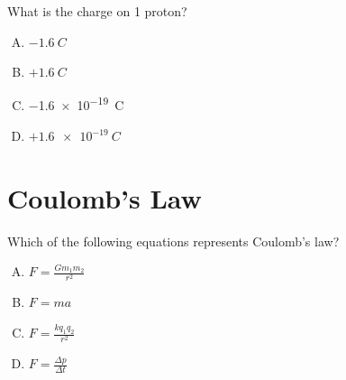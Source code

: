 \documentclass[14pt,t,dvipsnames]{beamer}
\begin{document}
\begin{frame}
What is the charge on 1 proton?
\begin{center}
\begin{minipage}{6cm}
\centering
\begin{enumerate}[A.]
    \item $-\SI{1.6}{C}$
    \item $+\SI{1.6}{C}$
    \item \alert<2->{\SI{-1.6e-19}{C}}
    \item $+\SI{1.6e-19}{C}$
\end{enumerate}
\end{minipage}
\begin{minipage}{3cm}
\centering
{}
\end{minipage}
\end{center}
\end{frame}

\section{Coulomb's Law}

\begin{frame}
Which of the following equations represents Coulomb's law?

\begin{enumerate}[A.]
    \item $\displaystyle F = \frac{G m_1 m_2}{r^2}$ \vspace{6pt}
    \item $F = m a$ \vspace{6pt}
    \item \alert<2->{$\displaystyle F = \frac{k q_1 q_2}{r^2}$} \vspace{6pt}
    \item $\displaystyle F = \frac{\Delta p}{\Delta t}$
\end{enumerate}
\end{frame}
\end{document}
